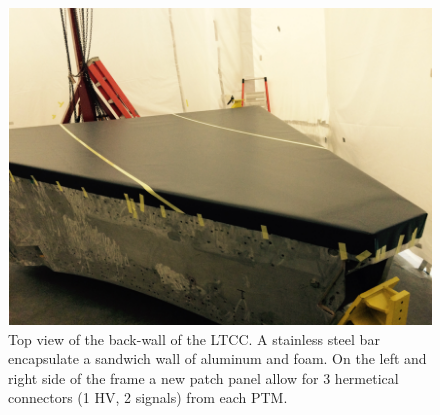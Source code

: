 \begin{figure}[hbt]
	\centering
	\includegraphics[width=1.0\columnwidth,keepaspectratio]{img/upstreamWindow.png}
	\caption{Top view of the back-wall of the LTCC. A stainless steel bar encapsulate a sandwich wall of aluminum and foam. On the left and right side
				 of the frame a new patch panel allow for 3 hermetical connectors (1 HV, 2 signals) from each PTM. }
	\label{fig:upstreamWindow.png}
\end{figure}





